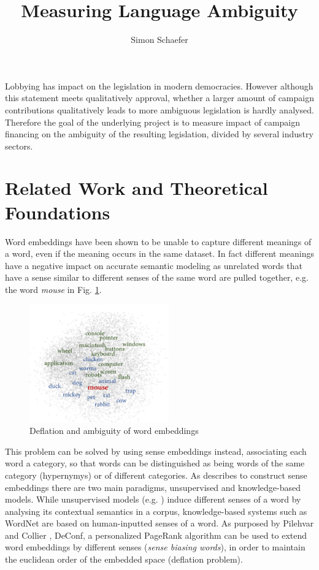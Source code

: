 \documentclass[a4paper, 12pt]{article}
\title{Measuring Language Ambiguity}
\author{Simon Schaefer}
\begin{document}
\maketitle

Lobbying has impact on the legislation in modern democracies. However although this statement meets qualitatively approval, whether a larger amount of campaign contributions qualitatively leads to more ambiguous legislation is hardly analysed. Therefore the goal of the underlying project is to measure impact of campaign financing on the ambiguity of the resulting legislation, divided by several industry sectors.

\section*{Related Work and Theoretical Foundations}
Word embeddings have been shown to be unable to capture different meanings of a word, even if the meaning occurs in the same dataset. In fact different meanings have a negative impact on accurate semantic modeling as unrelated words that have a sense similar to different senses of the same word are pulled together, e.g. the word \textit{mouse} in Fig. \ref{fig:conflation_word_embedding}.

\begin{figure}[H]
\begin{center}
\includegraphics[width=6cm]{imgs/conflation_word_embedding}
\end{center}
\caption{Deflation and ambiguity of word embeddings \cite{word_to_sense_embedding}}
\label{fig:conflation_word_embedding}
\end{figure}

This problem can be solved by using sense embeddings instead, associating each word a category, so that words can be distinguished as being words of the same category (hypernymys) or of different categories. As \cite{word_to_sense_embedding} describes to construct sense embeddings there are two main paradigms, unsupervised and knowledge-based models. While unsupervised models (e.g. \cite{unsupervised_latent_vector_weighting}) induce different senses of a word by analysing its contextual semantics in a corpus, knowledge-based systems such as WordNet \cite{wordnet} are based on human-inputted senses of a word. As purposed by Pilehvar and Collier \cite{knowledge_based_page_rank}, DeConf, a personalized PageRank algorithm can be used to extend word embeddings by different senses (\textit{sense biasing words}), in order to maintain the euclidean order of the embedded space (deflation problem).
\end{document}
